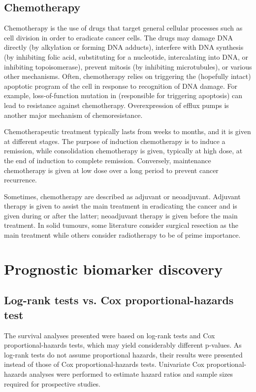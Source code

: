 \subsection{Chemotherapy}

Chemotherapy is the use of drugs that target general cellular processes such as cell division in order to eradicate cancer cells. The drugs may damage DNA directly (by alkylation or forming DNA adducts), interfere with DNA synthesis (by inhibiting folic acid, substituting for a nucleotide, intercalating into DNA, or inhibiting topoisomerase), prevent mitosis (by inhibiting microtubules), or various other mechanisms. Often, chemotherapy relies on triggering the (hopefully intact) apoptotic program of the cell in response to recognition of DNA damage. For example, loss-of-function mutation in  (responsible for triggering apoptosis) can lead to resistance against chemotherapy. Overexpression of efflux pumps is another major mechanism of chemoresistance.

Chemotherapeutic treatment typically lasts from weeks to months, and it is given at different stages. The purpose of induction chemotherapy is to induce a remission, while consolidation chemotherapy is given, typically at high dose, at the end of induction to complete remission. Conversely, maintenance chemotherapy is given at low dose over a long period to prevent cancer recurrence.

Sometimes, chemotherapy are described as adjuvant or neoadjuvant. Adjuvant therapy is given to assist the main treatment in eradicating the cancer and is given during or after the latter; neoadjuvant therapy is given before the main treatment. In solid tumours, some literature consider surgical resection as the main treatment while others consider radiotherapy to be of prime importance.


\section{Prognostic biomarker discovery}
\label{sec:prognostication}

\subsection{Log-rank tests vs. Cox proportional-hazards test}

The survival analyses presented were based on log-rank tests and Cox proportional-hazards tests, which may yield considerably different p-values. As log-rank tests do not assume proportional hazards, their results were presented instead of those of Cox proportional-hazards tests. Univariate Cox proportional-hazards analyses were performed to estimate hazard ratios and sample sizes required for prospective studies.

